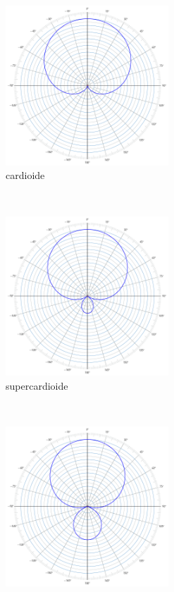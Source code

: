 \begin{figure}[h]
\begin{subfigure}[t]{0.48\textwidth}
        \includegraphics[height=6cm]{CAPITOLI/_TIKZ/POLAR/cardioid}
        \caption{cardioide}%
        \label{pol:cardio-p}
    \end{subfigure}
    ~
    \begin{subfigure}[t]{0.48\textwidth}
        \centering
        \includegraphics[height=6cm]{CAPITOLI/_TIKZ/POLAR/supercardioid}
        \caption{supercardioide}%
        \label{pol:super-p}
    \end{subfigure}
    \\
    \begin{subfigure}[t]{0.48\textwidth}
        \centering
        \includegraphics[height=6cm]{CAPITOLI/_TIKZ/POLAR/hypercardioid}

\end{subfigure}
\end{figure}
